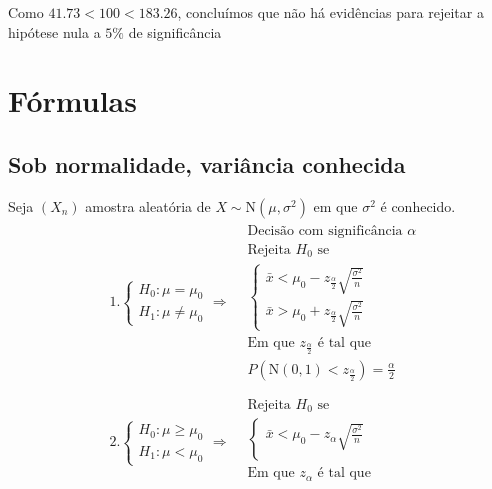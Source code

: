 \documentclass[
  letterpaper,
  DIV=11,
  numbers=noendperiod]{scrreprt}
\begin{document}
Como \(41.73<100<183.26\), concluímos que não há evidências para
rejeitar a hipótese nula a \(5\%\) de significância


\chapter{Fórmulas}\label{fuxf3rmulas}

\section{Sob normalidade, variância
conhecida}\label{sob-normalidade-variuxe2ncia-conhecida}

Seja \((X_{n})\) amostra aleatória de \(X\sim \mathrm{N}(\mu,\sigma^2)\)
em que \(\sigma^2\) é conhecido. \[
\begin{aligned}
&1.
\begin{cases}
H_{0} : \mu = \mu_{0} \\
H_{1}: \mu \neq \mu_{0}
\end{cases} \Rightarrow 
\begin{aligned}
& \text{Decisão com significância } \alpha \\
&\text{Rejeita $H_{0}$ se} \\
&\begin{cases}
\bar{x} < \mu_{0} - z_{\frac{\alpha}{2}} \sqrt{ \frac{\sigma^2}{n} } \\
\bar{x} > \mu_{0} + z_{\frac{\alpha}{2}} \sqrt{ \frac{\sigma^2}{n} }
\end{cases} \\
& \text{Em que $z_{\frac{\alpha}{2}}$ é tal que} \\
& P\left( \mathrm{N(0,1)} < z_{\frac{\alpha}{2}} \right) = \frac{\alpha}{2}
\end{aligned} \\ \\
& 2.
\begin{cases}
H_{0} : \mu \geq \mu_{0} \\
H_{1}: \mu < \mu_{0}
\end{cases} \Rightarrow 
\begin{aligned}
&\text{Rejeita $H_{0}$ se} \\
&\begin{cases}
\bar{x} < \mu_{0} - z_{\alpha} \sqrt{ \frac{\sigma^2}{n} } \\
\end{cases} \\
& \text{Em que $z_{\alpha}$ é tal que} \\

\end{aligned}
\end{aligned}\]
\end{document}
